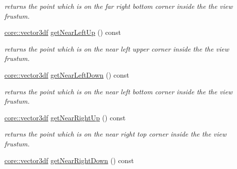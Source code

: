 \begin{DoxyCompactItemize}
\begin{DoxyCompactList}\small\item\em returns the point which is on the far right bottom corner inside the the view frustum. \end{DoxyCompactList}\item 
\mbox{\label{structirr_1_1scene_1_1SViewFrustum_ae2fae0821834125e0d34bb2fab27c643}} 
\hyperlink{namespaceirr_1_1core_ae6e2b2a6c552833ebbd5b7463d03586b}{core\+::vector3df} \hyperlink{structirr_1_1scene_1_1SViewFrustum_ae2fae0821834125e0d34bb2fab27c643}{get\+Near\+Left\+Up} () const
\begin{DoxyCompactList}\small\item\em returns the point which is on the near left upper corner inside the the view frustum. \end{DoxyCompactList}\item 
\mbox{\label{structirr_1_1scene_1_1SViewFrustum_ae73eb80d9fe631b8795bb9f9afdf5eff}} 
\hyperlink{namespaceirr_1_1core_ae6e2b2a6c552833ebbd5b7463d03586b}{core\+::vector3df} \hyperlink{structirr_1_1scene_1_1SViewFrustum_ae73eb80d9fe631b8795bb9f9afdf5eff}{get\+Near\+Left\+Down} () const
\begin{DoxyCompactList}\small\item\em returns the point which is on the near left bottom corner inside the the view frustum. \end{DoxyCompactList}\item 
\mbox{\label{structirr_1_1scene_1_1SViewFrustum_a498ea58e0ce6c52e655aa9d7fe387b84}} 
\hyperlink{namespaceirr_1_1core_ae6e2b2a6c552833ebbd5b7463d03586b}{core\+::vector3df} \hyperlink{structirr_1_1scene_1_1SViewFrustum_a498ea58e0ce6c52e655aa9d7fe387b84}{get\+Near\+Right\+Up} () const
\begin{DoxyCompactList}\small\item\em returns the point which is on the near right top corner inside the the view frustum. \end{DoxyCompactList}\item 
\mbox{\label{structirr_1_1scene_1_1SViewFrustum_a6143916b2000537b33834cfb9aa898fa}} 
\hyperlink{namespaceirr_1_1core_ae6e2b2a6c552833ebbd5b7463d03586b}{core\+::vector3df} \hyperlink{structirr_1_1scene_1_1SViewFrustum_a6143916b2000537b33834cfb9aa898fa}{get\+Near\+Right\+Down} () const

\end{DoxyCompactItemize}
